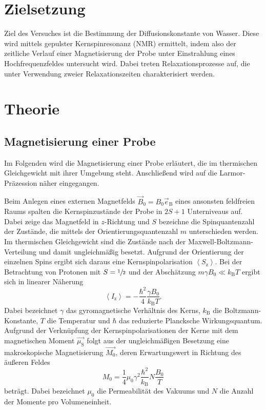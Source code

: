 \section{Zielsetzung}
\label{sec:Zielsetzung}

Ziel des Versuches ist die Bestimmung der Diffusionskonstante von Wasser.
Diese wird mittels gepulster Kernspinresonanz (NMR) ermittelt,
indem also der zeitliche Verlauf einer Magnetisierung der Probe unter
Einstrahlung eines Hochfrequenzfeldes untersucht wird.
Dabei treten Relaxationsprozesse auf, die unter Verwendung zweier
Relaxationszeiten charakterisiert werden.

\section{Theorie}
\label{sec:Theorie}

\subsection{Magnetisierung einer Probe}
\label{sec:TheoMagnetisierung}

Im Folgenden wird die Magnetisierung einer Probe erläutert, die im thermischen
Gleichgewicht mit ihrer Umgebung steht.
Anschließend wird auf die Larmor-Präzession näher eingegangen.

Beim Anlegen eines externen Magnetfelds $\vec{B}_0 = B_0 \vec{e}_\text{B}$ eines ansonsten
feldfreien Raums spalten die Kernspinzustände der Probe in $2S+1$ Unterniveaus auf.
Dabei zeige das Magnetfeld in $z$-Richtung und $S$ bezeichne die Spinquantenzahl der
Zustände, die mittels der Orientierungsquantenzahl $m$ unterschieden werden.
Im thermischen Gleichgewicht sind die Zustände nach der Maxwell-Boltzmann-Verteilung
und damit ungleichmäßig besetzt.
Aufgrund der Orientierung der einzelnen Spins ergibt sich daraus eine Kernspinpolarisation
$\left<S_\text{z}\right>$.
Bei der Betrachtung von Protonen mit $S = \sfrac{1}{2}$ und der Abschätzung
$m \gamma B_0 \ll k_\text{B} T$ ergibt sich in linearer Näherung
\begin{equation*}
  \left<I_\text{z}\right> = -\frac{\hbar^2}{4}\frac{\gamma B_0}{k_\text{B} T}.
\end{equation*}
Dabei bezeichnet $\gamma$ das gyromagnetische Verhältnis des Kerns,
$k_\text{B}$ die Boltzmann-Konstante, $T$ die Temperatur
und $\hbar$ das reduzierte Plancksche Wirkungsquantum.
Aufgrund der Verknüpfung der Kernspinpolarisationen der Kerne
mit dem magnetischen Moment $\vec{\mu_\text{S}}$ folgt aus der ungleichmäßigen
Besetzung eine makroskopische Magnetisierung $\vec{M_0}$,
deren Erwartungswert in Richtung des äußeren Feldes
\begin{equation*}
  M_0 = \frac{1}{4} \mu_0 \gamma^2 \frac{\hbar^2}{k_\text{B}} N \frac{B_0}{T}
\end{equation*}
beträgt.
Dabei bezeichnet $\mu_0$ die Permeabilität des Vakuums und
$N$ die Anzahl der Momente pro Volumeneinheit.

